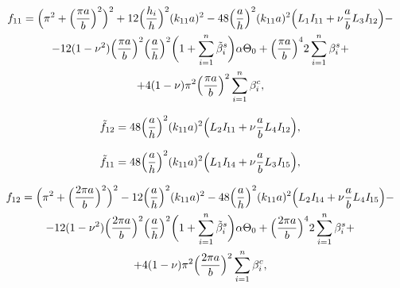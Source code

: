 \begin{multline}

f_{11}=\Bigl(\pi^2+\Bigl( \frac{\pi a}{b}\Bigr) ^2 \Bigr) ^2+

12

\Bigl( \frac{h_i}{h}\Bigr)^2(k_{11}a)^2-

48

\Bigl( \frac{a}{h}\Bigr)^2 (k_{11}a)^2\Bigl(L_1\mathit{I}_{11}+\nu \frac{a}{b}L_3 \mathit{I}_{12} \Bigr) -

\\

-12(1-\nu^2)\Bigl( \frac{\pi a}{b}\Bigr)^2 \Bigl(\frac{a}{h} \Bigr)^2

\biggl(1+\sum\limits_{i=1}^n \tilde{\beta}_i^s \biggr) \alpha \Theta_0+

\Bigl( \frac{\pi a}{b}\Bigr)^4 2\sum\limits_{i=1}^n \beta_i^s+

\\

+4(1-\nu)\pi^2\Bigl(\frac{\pi a}{b} \Bigr)^2  \sum\limits_{i=1}^n \beta_i^c,

\end{multline}

\begin{equation*}

\tilde{f}_{12}=48 \Bigl(\frac{a}{h} \Bigr)^2(k_{11}a)^2\Bigl(L_2 \mathit{I}_{11}+\nu\frac{a}{b}L_4\mathit{I}_{12}\Bigr),

\end{equation*}

\begin{equation*}

\tilde{f}_{11}=48 \Bigl(\frac{a}{h} \Bigr)^2(k_{11}a)^2\Bigl(L_1 \mathit{I}_{14}+\nu \frac{a}{b}L_3\mathit{I}_{15}\Bigr),

\end{equation*}

\begin{multline}

f_{12}=\Bigl(\pi^2+\Bigl( \frac{2\pi a}{b}\Bigr) ^2 \Bigr)^2-

12\Bigl( \frac{a}{h}\Bigr)^2(k_{11}a)^2-

48\Bigl( \frac{a}{h}\Bigr)^2 (k_{11}a)^2 \Bigl(L_2\mathit{I}_{14}+\nu \frac{a}{b}L_4 \mathit{I}_{15} \Bigr) -

\\

-12(1-\nu^2)\Bigl( \frac{2\pi a}{b}\Bigr)^2

\Bigl(\frac{a}{h} \Bigr)^2

\biggl(1+\sum\limits_{i=1}^n \tilde{\beta}_i^s \biggr) \alpha \Theta_0+\Bigl( \frac{2\pi a}{b}\Bigr)^4 2\sum\limits_{i=1}^n \beta_i^s+

\\

+4(1-\nu)\pi^2\Bigl(\frac{2\pi a}{b} \Bigr)^2  \sum\limits_{i=1}^n \beta_i^c, 

\end{multline}

